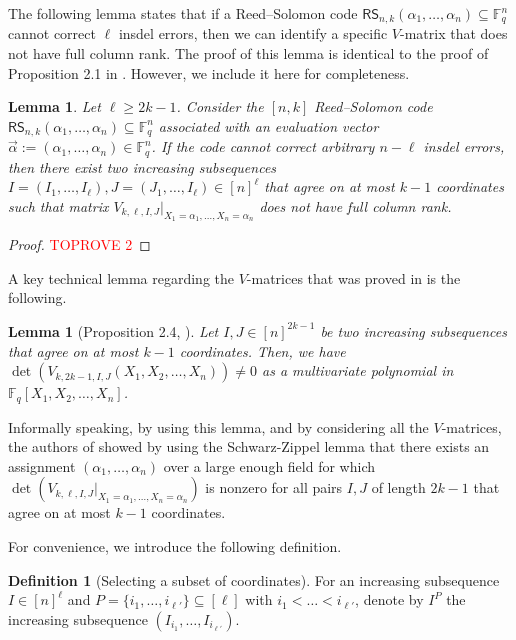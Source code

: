 \documentclass[11pt]{article}
\theoremstyle{plain}
\newtheorem{lemma}[thm]{Lemma}
\theoremstyle{definition}
\newtheorem{defn}[thm]{Definition}
\theoremstyle{remark}
\newcommand{\F}{\mathbb{F}}
\begin{document}
The following lemma states that if a Reed--Solomon code $\mathsf{RS}_{n,k}(\alpha_1, \ldots, \alpha_n)\subseteq\F_q^n$ cannot correct $\ell$ insdel errors, then we can identify a specific $V$-matrix that does not have full column rank. 
The proof of this lemma is identical to the proof of Proposition 2.1 in \cite{con2023reed}. However, we include it here for completeness.


\begin{lemma}\label{bad}
Let $\ell\ge 2k-1$. 
Consider the $[n, k]$ Reed--Solomon code $\mathsf{RS}_{n,k}(\alpha_1, \ldots, \alpha_n)\subseteq\F_q^n$ associated with an evaluation vector $\vec{\alpha}:=\left(\alpha_1, \ldots, \alpha_n\right)\in\F_q^n$. If 
the code cannot correct arbitrary $n-\ell$ insdel errors, then there exist two increasing subsequences $I=(I_1,\dots,I_\ell), J=(J_1,\dots,I_\ell) \in[n]^{\ell}$ that agree on at most $k-1$ coordinates
such that matrix $V_{k,\ell,I, J}|_{X_{1}=\alpha_{1},\dots,X_{n}=\alpha_{n}}$ does not have full column rank.
\end{lemma}

\begin{proof}\textcolor{red}{TOPROVE 2}\end{proof}

A key technical lemma regarding the $V$-matrices that was proved in \cite{con2023reed} is the following.
\begin{lemma}[Proposition 2.4, \cite{con2023reed}]\label{nonzero}
    Let $I, J \in[n]^{2k-1}$ be two increasing subsequences that agree on at most $k-1$ coordinates.  
		Then, we have $\det\left(V_{k,2k-1,I,J}(X_1,X_2,\ldots,X_n)\right)\neq 0$ as a multivariate polynomial in $\F_q[X_1,X_2,\ldots,X_n]$.
\end{lemma}

Informally speaking, by using this lemma, and by considering all the $V$-matrices, the authors of \cite{con2023reed} showed by using the Schwarz-Zippel lemma that there exists an assignment $(\alpha_1, \ldots, \alpha_n)$ over a large enough field for which $\det (V_{k,\ell,I, J}|_{X_{1}=\alpha_{1},\dots,X_{n}=\alpha_{n}})$ is nonzero for all pairs $I,J$ of length $2k-1$ that agree on at most $k-1$ coordinates.


For convenience, we introduce the following definition. 
\begin{defn}[Selecting a subset of coordinates] \label{defn:restriction}
For an increasing subsequence $I\in [n]^{\ell}$ and $P=\{i_1,\dots,i_{\ell'}\}\subseteq [\ell]$ with $i_1<\dots<i_{\ell'}$, denote by $I^P$ the increasing subsequence $(I_{i_1},\dots,I_{i_{\ell'}})$.
\end{defn}
\end{document}
